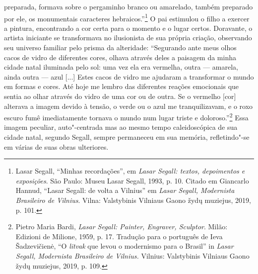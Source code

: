 preparada, formava sobre o pergaminho branco ou amarelado, também
preparado por ele, os monumentais caracteres hebraicos.''\footnote{Lasar Segall, ``Minhas recordações'', em \textit{Lasar Segall: textos, depoimentos
  e exposições}. São Paulo: Museu Lasar Segall, 1993, p. 10. Citado em
  Giancarlo Hannud, ``Lasar Segall: de volta a Vilnius'' em \textit{Lasar
  Segall, Modernista Brasileiro de Vilnius}. Vilna: Valstybinis
  Vilniaus Gaono žydų muziejus, 2019, p. 101.} O pai estimulou o filho a
exercer a pintura, encontrando a cor certa para o momento e o lugar
certos. Doravante, o artista iniciante se transformava no ilusionista de
sua própria criação, observando seu universo familiar pelo prisma da
alteridade: ``Segurando ante meus olhos cacos de vidro de diferentes
cores, olhava através deles a paisagem da minha cidade natal iluminada
pelo sol: uma vez ela era vermelha, outra --- amarela, ainda outra ---
azul {[}...{]} Estes cacos de vidro me ajudaram a transformar o mundo em
formas e cores. Até hoje me lembro das diferentes reações emocionais que
sentia ao olhar através do vidro de uma cor ou de outra. Se o vermelho
{[}cor{]} alterava a imagem devido à tensão, o verde ou o azul me
tranquilizavam, e o roxo escuro fumê imediatamente tornava o mundo num
lugar triste e doloroso.''\footnote{Pietro Maria Bardi, \textit{Lasar
  Segall: Painter, Engraver, Sculptor}. Milão: Edizioni de Milione,
  1959, p. 17. Tradução para o português de Ieva Šadzevičienė, ``O
  \textit{litvak} que levou o modernismo para o Brasil'' in \textit{Lasar Segall,
  Modernista Brasileiro de Vilnius.} Vilnius: Valstybinis Vilniaus Gaono
  žydų muziejus, 2019, p. 109.} Essa imagem peculiar, auto"-centrada mas
ao mesmo tempo caleidoscópica de sua cidade natal, segundo Segall,
sempre permaneceu em sua memória, refletindo"-se em várias de suas obras
ulteriores.

